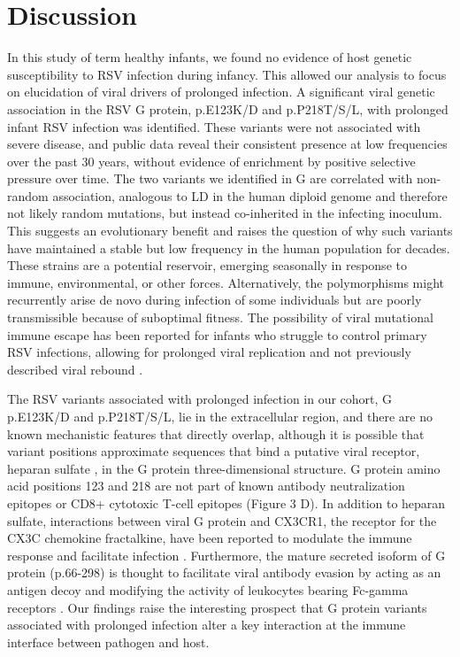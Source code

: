 \documentclass[9pt,lineno]{elife}  %
\begin{document}
\section{Discussion}
In this study of term healthy infants, we found no evidence of host genetic susceptibility to RSV infection during infancy. 
This allowed our analysis to focus on elucidation of viral drivers of prolonged infection. 
A significant viral genetic association in the RSV G protein, p.E123K/D and p.P218T/S/L, with prolonged infant RSV infection was identified. 
These variants were not associated with severe disease, and public data reveal their consistent presence at low frequencies over the past 30 years, without evidence of enrichment by positive selective pressure over time. 
The two variants we identified in G are correlated with non-random association, analogous to LD in the human diploid genome and therefore not likely random mutations, but instead co-inherited in the infecting inoculum. 
This suggests an evolutionary benefit and raises the question of why such variants have maintained a stable but low frequency in the human population for decades. 
These strains are a potential reservoir, emerging seasonally in response to immune, environmental, or other forces. 
Alternatively, the polymorphisms might recurrently arise de novo during infection of some individuals but are poorly transmissible because of suboptimal fitness. 
The possibility of viral mutational immune escape has been reported for infants who struggle to control primary RSV infections, allowing for prolonged viral replication and not previously described viral rebound 
\citep{brint2017prolonged}.

The RSV variants associated with prolonged infection in our cohort, G p.E123K/D and p.P218T/S/L, lie in the extracellular region, and there are no known mechanistic features that directly overlap, although it is possible that variant positions approximate sequences that bind a putative viral receptor, heparan sulfate 
\citep{feldman1999identification}, in the G protein three-dimensional structure. G protein amino acid positions 123 and 218 are not part of known antibody neutralization epitopes or CD8+ cytotoxic T-cell epitopes (Figure 3 D). 
In addition to heparan sulfate, interactions between viral G protein and CX3CR1, the receptor for the CX3C chemokine fractalkine, have been reported to modulate the immune response and facilitate infection 
\citep{levine1987demonstration, feldman1999identification, feldman2000fusion, johnson2015respiratory, tripp2001cx3c, jeong2015cx3cr1}.
Furthermore, the mature secreted isoform of G protein (p.66-298) is thought to facilitate viral antibody evasion by acting as an antigen decoy and modifying the activity of leukocytes bearing Fc-gamma receptors 
\citep{bukreyev2008secreted}. 
Our findings raise the interesting prospect that G protein variants associated with prolonged infection alter a key interaction at the immune interface between pathogen and host.
\end{document}
